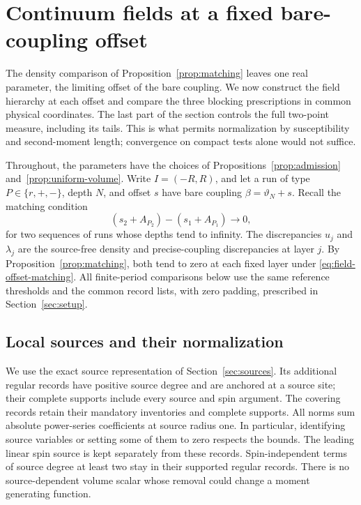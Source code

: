 \section{Continuum fields at a fixed bare-coupling offset}
\label{sec:fields}

The density comparison of Proposition~\ref{prop:matching} leaves one
real parameter, the limiting offset of the bare coupling.  We now
construct the field hierarchy at each offset and compare the three
blocking prescriptions in common physical coordinates.  The last part
of the section controls the full two-point measure, including its tails.
This is what permits normalization by susceptibility and second-moment
length; convergence on compact tests alone would not suffice.

Throughout, the parameters have the choices of
Propositions~\ref{prop:admission} and~\ref{prop:uniform-volume}.
Write $I=(-R,R)$, and let a run of type $P\in\{r,+,-\}$, depth $N$,
and offset $s$ have bare coupling $\beta=\vartheta_N+s$.
Recall the matching condition
\begin{equation}
 (s_2+A_{P_2})-(s_1+A_{P_1})\longrightarrow0,
 \label{eq:field-offset-matching}
\end{equation}
for two sequences of runs whose depths tend to infinity.  The
discrepancies $u_j$ and $\lambda_j$ are the source-free density and
precise-coupling discrepancies at layer $j$.  By
Proposition~\ref{prop:matching}, both tend to zero at each fixed layer
under \eqref{eq:field-offset-matching}.  All finite-period comparisons
below use the same reference thresholds and the common record lists,
with zero padding, prescribed in Section~\ref{sec:setup}.

\subsection{Local sources and their normalization}

We use the exact source representation of Section~\ref{sec:sources}.
Its additional regular records have positive source degree and are
anchored at a source site; their complete supports include every source
and spin argument.  The covering records retain their mandatory
inventories and complete supports.  All norms sum absolute power-series
coefficients at source radius one.  In particular, identifying source
variables or setting some of them to zero respects the bounds.
The leading linear spin source is kept separately from these records.
Spin-independent terms of source degree at least two stay in their
supported regular records.  There is no source-dependent volume scalar
whose removal could change a moment generating function.

